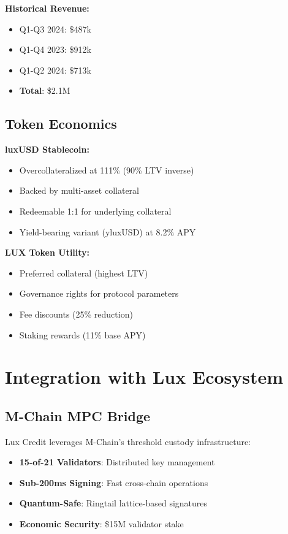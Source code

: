 \documentclass[11pt,a4paper]{article}
\begin{document}
\textbf{Historical Revenue:}
\begin{itemize}
\item Q1-Q3 2024: \$487k
\item Q1-Q4 2023: \$912k
\item Q1-Q2 2024: \$713k
\item \textbf{Total}: \$2.1M
\end{itemize}

\subsection{Token Economics}

\textbf{luxUSD Stablecoin:}
\begin{itemize}
\item Overcollateralized at 111\% (90\% LTV inverse)
\item Backed by multi-asset collateral
\item Redeemable 1:1 for underlying collateral
\item Yield-bearing variant (yluxUSD) at 8.2\% APY
\end{itemize}

\textbf{LUX Token Utility:}
\begin{itemize}
\item Preferred collateral (highest LTV)
\item Governance rights for protocol parameters
\item Fee discounts (25\% reduction)
\item Staking rewards (11\% base APY)
\end{itemize}

\section{Integration with Lux Ecosystem}

\subsection{M-Chain MPC Bridge}

Lux Credit leverages M-Chain's threshold custody infrastructure:

\begin{itemize}
\item \textbf{15-of-21 Validators}: Distributed key management
\item \textbf{Sub-200ms Signing}: Fast cross-chain operations
\item \textbf{Quantum-Safe}: Ringtail lattice-based signatures
\item \textbf{Economic Security}: \$15M validator stake
\end{itemize}
\end{document}
